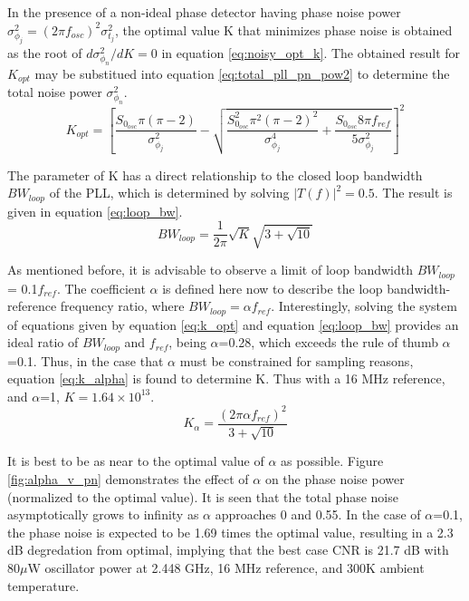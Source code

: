 			In the presence of a non-ideal phase detector having phase noise power $\sigma^2_{\phi_j} = (2\pi f_{osc})^2\sigma^2_{t_j}$, the optimal value K that minimizes phase noise is obtained as the root of $d\sigma^2_{\phi_n}/dK = 0$ in equation \ref{eq:noisy_opt_k}. The obtained result for $K_{opt}$ may be substitued into equation \ref{eq:total_pll_pn_pow2} to determine the total noise power $\sigma^2_{\phi_n}$. 
			\begin{equation}\label{eq:noisy_opt_k}
				K_{opt} = \left[\frac{S_{0_{osc}}\pi(\pi-2)}{\sigma^2_{\phi_j}} -
				\sqrt{\frac{S_{0_{osc}}^2\pi^2(\pi-2)^2}{\sigma^4_{\phi_j}} +
				\frac{S_{0_{osc}}8\pi f_{ref}}{5\sigma^2_{\phi_j}}} \right]^2 
			\end{equation}

			The parameter of K has a direct relationship to the closed loop bandwidth $BW_{loop}$ of the PLL, which is determined by solving $|T(f)|^2 = 0.5$. The result is given in equation \ref{eq:loop_bw}. 
			\begin{equation}\label{eq:loop_bw} 
				BW_{loop} = \frac{1}{2\pi}\sqrt{K}\sqrt{3+
				\sqrt{10}} 
			\end{equation} 

			As mentioned before, it is advisable to observe a limit of loop bandwidth $BW_{loop}$ = 0.1$f_{ref}$. The coefficient $\alpha$ is defined here now to describe the loop bandwidth-reference frequency ratio, where $BW_{loop} = \alpha f_{ref}$. Interestingly, solving the system of equations given by equation \ref{eq:k_opt} and equation \ref{eq:loop_bw} provides an ideal ratio of $BW_{loop}$ and $f_{ref}$, being $\alpha$=0.28, which exceeds the rule of thumb $\alpha$=0.1. Thus, in the case that $\alpha$ must be constrained for sampling reasons, equation \ref{eq:k_alpha} is found to determine K. Thus with a 16 MHz reference, and $\alpha$=1, $K=1.64\times10^{13}$. 
			\begin{equation}\label{eq:k_alpha} 
				K_\alpha = \frac{(2\pi\alpha f_{ref})^2}{3
				+ \sqrt{10}} 
			\end{equation}

			It is best to be as near to the optimal value of $\alpha$ as possible. Figure \ref{fig:alpha_v_pn} demonstrates the effect of $\alpha$ on the phase noise power (normalized to the optimal value). It is seen that the total phase noise asymptotically grows to infinity as $\alpha$ approaches 0 and 0.55. In the case of $\alpha$=0.1, the phase noise is expected to be 1.69 times the optimal value, resulting in a 2.3 dB degredation from optimal, implying that the best case CNR is 21.7 dB with 80$\mu$W oscillator power at 2.448 GHz, 16 MHz reference, and 300K ambient temperature.

